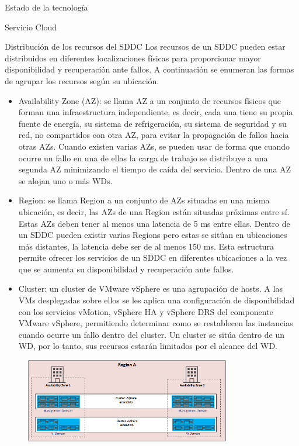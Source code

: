 \begin{chapter}{Estado de la tecnología}
\begin{section}{Servicio Cloud}
        \begin{subsubsection}{Distribución de los recursos del SDDC}
          Los recursos de un SDDC pueden estar distribuidos en diferentes localizaciones físicas para proporcionar mayor disponibilidad y recuperación ante fallos. A continuación se enumeran las formas de agrupar los recursos según su ubicación.
        \begin{itemize}
          \item Availability Zone (AZ): se llama AZ a un conjunto de recursos físicos que forman una infraestructura independiente, es decir, cada una tiene su propia fuente de energía, su sistema de refrigeración, su sistema de seguridad y su red, no compartidos con otra AZ, para evitar la propagación de fallos hacia otras AZs. Cuando existen varias AZs, se pueden usar de forma que cuando ocurre un fallo en una de ellas la carga de trabajo se distribuye a una segunda AZ minimizando el tiempo de caída del servicio. Dentro de una AZ se alojan uno o más WDs.
          \item Region: se llama Region a un conjunto de AZs situadas en una misma ubicación, es decir, las AZs de una Region están situadas próximas entre sí. Estas AZs deben tener al menos una latencia de 5 ms\cite{latency} entre ellas. Dentro de un SDDC pueden existir varias Regions pero estas se sitúan en ubicaciones más distantes, la latencia debe ser de al menos 150 ms\cite{latency}. Esta estructura permite ofrecer los servicios de un SDDC en diferentes ubicaciones a la vez que se aumenta su disponibilidad y recuperación ante fallos.    
          \item Cluster: un cluster de VMware vSphere es una agrupación de hosts. A las VMs desplegadas sobre ellos se les aplica una configuración de disponibilidad con los servicios vMotion, vSphere HA y vSphere DRS del componente VMware vSphere, permitiendo determinar como se restablecen las instancias cuando ocurre un fallo dentro del cluster. Un cluster se sitúa dentro de un WD, por lo tanto, sus recursos estarán limitados por el alcance del WD.
        \end{itemize} 
        \begin{figure}[h!]
          \centering
          \includegraphics[width=0.8\textwidth]{imaxes/conceptosPrevios/AZRegionCluster.png}

\end{figure}
\end{subsubsection}
\end{section}
\end{chapter}
